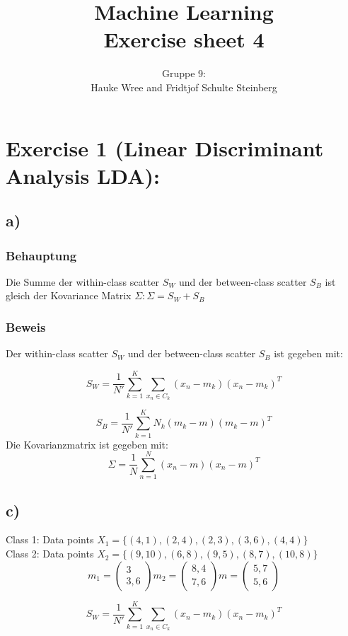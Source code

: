 \documentclass[a4paper,parskip=full-]{article}
\title{Machine Learning \\
Exercise sheet 4}
\author{Gruppe 9: \\Hauke Wree and Fridtjof Schulte Steinberg}
\begin{document}
\maketitle

\section{Exercise 1 (Linear Discriminant Analysis LDA):}
\subsection{a)}

\subsubsection{Behauptung}
Die Summe der within-class scatter $S_W$ 
und der between-class scatter $S_B$ 
ist gleich der Kovariance Matrix $\Sigma:\Sigma = S_W + S_B$

\subsubsection{Beweis}
Der within-class scatter $S_W$ und der between-class scatter $S_B$ ist gegeben mit:

$$
S_W = \frac{1}{N'} \sum^K_{k=1} \sum_{x_n \in C_k} (x_n-m_k)(x_n-m_k)^T
$$

$$
S_B = \frac{1}{N'} \sum^K_{k=1} N_k (m_k-m)(m_k-m)^T
$$
Die Kovarianzmatrix ist gegeben mit:
$$
\Sigma =  \frac{1}{N} \sum^N_{n=1} (x_n-m)(x_n-m)^T
$$

\subsection{c)}
Class 1: Data points $X_1 = \{(4,1),(2,4),(2,3),(3,6),(4,4) \}$ \\
Class 2: Data points $X_2 = \{(9,10),(6,8),(9,5),(8,7),(10,8) \}$ \\

$$
m_1 = 
\begin{pmatrix}
3 \\ 3,6
\end{pmatrix}
m_2 = \begin{pmatrix}
8,4 \\ 7,6
\end{pmatrix}
m = \begin{pmatrix}
5,7 \\ 5,6
\end{pmatrix}
$$

$$
S_W = \frac{1}{N'} \sum^K_{k=1} \sum_{x_n \in C_k} (x_n-m_k)(x_n-m_k)^T

$$
\end{document}

